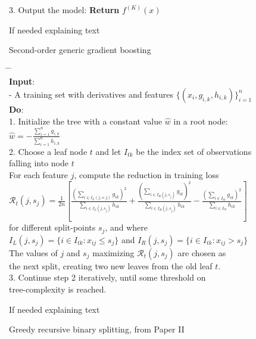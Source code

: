 \begin{algorithm*}[h!]
\begin{tabbing}
		3. Output the model: {\bfseries Return} $f^{(K)}(x)$%
		
	\end{tabbing}
	
	\vspace{0.5cm}
	If needed explaining text
	\vspace{0.5cm}
	
	\caption{\label{alg:gradient-boosting} Second-order generic gradient boosting \cite{friedman2001elements} }
\end{algorithm*}
\begin{algorithm*}[h!]
	\begin{tabbing}
		\hspace{2em} \= \hspace{2em} \= \hspace{2em} \= \\
		{\bfseries Input}: \\
		\> - A training set with derivatives and features $\{(x_i, g_{i,k}, h_{i,k})\}_{i=1}^n$\\
		
		{\bfseries Do}: \\
		1. Initialize the tree with a constant value $\hat{w}$ in a root node:\\
		\>	$\hat{w} = - \frac{\sum_{i=1}^{n}g_{i,k}}{\sum_{i=1}^{n}h_{i,k}}$\\
		
		2. Choose a leaf node $t$ and let $I_{tk}$ be the index set of observations\\
		\> falling into node $t$\\ 
		\> For each feature $j$, compute the reduction in training loss\\
		\> $ \mathcal{R}_t(j,s_j)=\frac{1}{2n}\left[ \frac{\left(\sum_{i\in I_{L}(j,s:j)}g_{ik}\right)^2}{\sum_{i\in I_{L}(j,s_j)}h_{ik}}
		+ \frac{\left(\sum_{i\in I_{R}(j,s_j)}g_{ik}\right)^2}{\sum_{i\in I_{R}(j,s_j)}h_{ik}}	
		-\frac{\left(\sum_{i\in I_{tk}}g_{ik}\right)^2}{\sum_{i\in I_{tk}}h_{ik}} \right] $\\
		\> 		for different split-points $s_j$, and where\\ 
		\> $I_{L}(j,s_j) = \{ i\in I_{tk}: x_{ij}\leq s_j \}$ and
		 $I_{R}(j, s_j) = \{ i\in I_{tk} : x_{ij} > s_j \}$\\
		\> The values of $j$ and $s_j$ maximizing $\mathcal R_t(j,s_j)$ are chosen as\\
		\> the next split, creating two new leaves from the old leaf $t$.\\
		
		3. Continue step 2 iteratively, until some threshold on\\
		\> tree-complexity is reached.
		
	\end{tabbing}
	
	\vspace{0.5cm}
	If needed explaining text
	\vspace{0.5cm}
	
	\caption{\label{alg:recursive-binary-splitting} Greedy recursive binary splitting, from Paper II }
\end{algorithm*}

